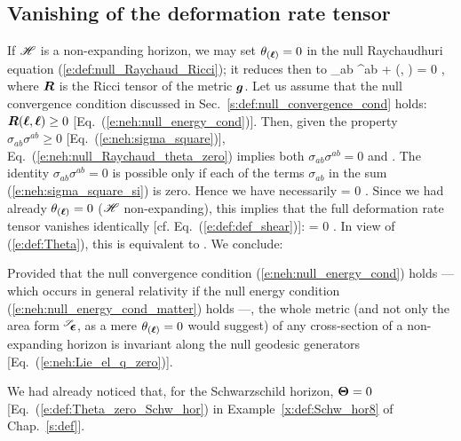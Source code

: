 \subsection{Vanishing of the deformation rate tensor}

If $\mathscr{H}$ is a non-expanding horizon, we may set $\theta_{(\bm{\ell})}=0$
in the null Raychaudhuri equation (\ref{e:def:null_Raychaud_Ricci}); it reduces then
to
\be \label{e:neh:null_Raychaud_theta_zero}
    \sigma_{ab} \sigma^{ab} + (\wl, \wl) = 0 ,
\ee
where $\bm{R}$ is the Ricci tensor of the metric $\bm{g}$.
Let us assume that the null convergence condition
discussed in Sec.~\ref{s:def:null_convergence_cond}
holds: $\bm{R}(\bm{\ell}, \bm{\ell}) \geq 0$ [Eq.~(\ref{e:neh:null_energy_cond})].
Then, given the property $\sigma_{ab} \sigma^{ab} \geq 0$
[Eq.~(\ref{e:neh:sigma_square})],
Eq.~(\ref{e:neh:null_Raychaud_theta_zero}) implies both
$\sigma_{ab} \sigma^{ab}  = 0$
and
\be \label{e:neh:R_l_l_zero}
    .
\ee
The identity $\sigma_{ab} \sigma^{ab} = 0$ is possible only if each of
the terms $\sigma_{ab}$ in the sum (\ref{e:neh:sigma_square_si}) is zero. Hence we have necessarily
\be
    \w{\sigma} = 0 .
\ee
Since we had already $\theta_{(\bm{\ell})}=0$ ($\mathscr{H}$ non-expanding), this implies that the full deformation rate tensor
vanishes identically [cf. Eq.~(\ref{e:def:def_shear})]:
\be
    \w{\Theta} = 0 .
\ee
In view of (\ref{e:def:Theta}), this is equivalent to
\be \label{e:neh:Lie_el_q_zero}
     .
\ee
We conclude:
\begin{prop}
\label{p:neh:invariance_of_2metric}
Provided that the null convergence condition (\ref{e:neh:null_energy_cond})
holds --- which occurs in general relativity if the
null energy condition
(\ref{e:neh:null_energy_cond_matter})
holds ---,
the whole metric (and not only the area form
${}^{\mathscr{S}}\!\!\bm{\epsilon}$, as a mere $\theta_{(\bm{\ell})}=0$ would suggest) of any cross-section
of a non-expanding horizon is invariant along the null geodesic generators
[Eq.~(\ref{e:neh:Lie_el_q_zero})].
\end{prop}

\begin{example}
We had already noticed that, for the Schwarzschild horizon, $\bm{\Theta}=0$
[Eq.~(\ref{e:def:Theta_zero_Schw_hor}) in Example~\ref{x:def:Schw_hor8}
of Chap.~\ref{s:def}].
\end{example}


